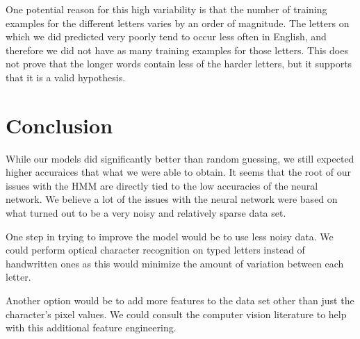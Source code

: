 \documentclass[11pt,a4paper,twocolumn]{article}
\begin{document}
One potential reason for this high variability is that the number of training examples for the
different letters varies by an order of magnitude. The letters on which we did predicted very poorly
tend to occur less often in English, and therefore we did not have as many training examples for
those letters. This does not prove that the longer words contain less of the harder letters, but it
supports that it is a valid hypothesis. 


\section{Conclusion}

While our models did significantly better than random guessing, we still expected higher accuraices
that what we were able to obtain. It seems that the root of our issues with the HMM are directly
tied to the low accuracies of the neural network. We believe a lot of the issues with the neural
network were based on what turned out to be a very noisy and relatively sparse data set. 

One step in trying to improve the model would be to use less noisy data. We could perform optical
character recognition on typed letters instead of handwritten ones as this would minimize the amount
of variation between each letter. 

Another option would be to add more features to the data set other than just the character's pixel
values. We could consult the computer vision literature to help with this additional feature
engineering. 




\end{document}
